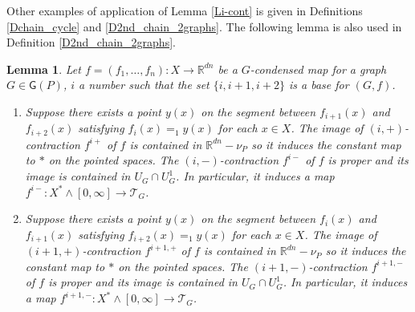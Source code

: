 \documentclass[reqno]{amsart}
\theoremstyle{definition}
\theoremstyle{plain}
\newtheorem{lem}[defi]{Lemma}
\newcommand{\TT}{\mathcal{T}} %
\newcommand{\GG}{\mathsf{G}}%
\newcommand{\RR}{\mathbb{R}}
\begin{document}
Other examples of application of  Lemma \ref{Li-cont} is given in Definitions \ref{Dchain_cycle} and \ref{D2nd_chain_2graphs}. The following lemma is also used in Definition \ref{D2nd_chain_2graphs}.
\begin{lem}\label{Li-cont2}
Let $f=(f_1,\dots, f_n):X\to \RR^{dn}$ be a $G$-condensed map for a graph $G\in\GG(P)$,  $i$ a number such that the set $\{i, i+1, i+2\}$ is a base for $(G,f)$. 
\begin{enumerate}
\item Suppose there exists a point $y(x)$ on the segment between $f_{i+1}(x)$ and $f_{i+2}(x)$ satisfying $f_i(x)=_1y(x)$ for each $x\in X$.
The image of $(i,+)$-contraction $f^{i+}$ of $f$ is contained in $\RR^{dn}-\nu_P$ so it induces the constant map to $*$ on the pointed spaces.
 The $(i,-)$-contraction $f^{i-}$ of $f$ is proper and its image is contained in  $U_{G}\cap U^1_{G}$. In particular, it induces a map $f^{i-}:X^*\wedge[0,\infty]\to \TT_{G}$.
\item Suppose there exists a point $y(x)$ on the segment between $f_{i}(x)$ and $f_{i+1}(x)$ satisfying $f_{i+2}(x)=_1y(x)$ for each $x\in X$.
 The image of $(i+1,+)$-contraction $f^{i+1,+}$ of $f$ is contained in $\RR^{dn}-\nu_P$ so it induces the constant map to $*$ on the pointed spaces.
 The $(i+1,-)$-contraction $f^{i+1,-}$ of $f$ is proper and its image is contained in  $U_{G}\cap U^1_{G}$. In particular, it induces a map $f^{i+1, -}:X^*\wedge[0,\infty]\to \TT_{G}$.

\end{enumerate}

\end{lem}
\end{document}
